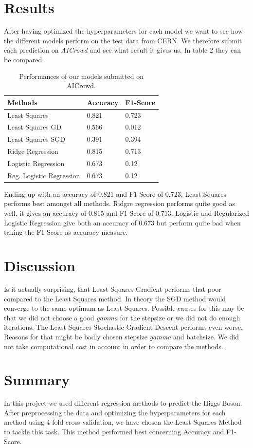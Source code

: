 \documentclass[10pt,conference,compsocconf]{IEEEtran}
\begin{document}
\section{Results}


After having optimized the hyperparameters for each model we want to see how the different models perform on the test data from CERN. We therefore submit each prediction on \textit{AICrowd} and see what result it gives us. In table 2 they can be compared.


\begin{table}[htbp]
	\centering
	\begin{tabular}[c]{|l||l|l|}
		\hline
		Methods&Accuracy&F1-Score\\
		\hline
		Least Squares&0.821&0.723\\
		Least Squares GD&0.566&0.012\\
		Least Squares SGD&0.391&0.394\\		
		Ridge Regression&0.815&0.713\\
		Logistic Regression&0.673&0.12\\
		Reg. Logistic Regression&0.673&0.12\\
		\hline
	\end{tabular}
	\caption{Performances of our models submitted on AICrowd.}
	\label{tab:perform}
\end{table}

Ending up with an accuracy of 0.821 and F1-Score of 0.723, Least Squares performs best amongst all methods. Ridgre regression performs quite good as well, it gives an accuracy of 0.815 and F1-Score of 0.713.
Logistic and Regularized Logistic Regression give both an accuracy of 0.673 but perform quite bad when taking the F1-Score as accuracy measure. 

\section{Discussion}

Is it actually surprising, that Least Squares Gradient performs that poor compared to the Least Squares method. In theory the SGD method would converge to the same optimum as Least Squares. Possible causes for this may be that we did not choose a good \textit{gamma} for the stepsize or we did not do enough iterations. The Least Squares Stochastic Gradient Descent performs even worse. Reasons for that might be badly chosen stepsize \textit{gamma} and batchsize. We did not take computational cost in account in order to compare the methods. 




\section{Summary}

In this project we used different regression methods to predict the Higgs Boson. After preprocessing the data and optimizing the hyperparameters for each method using 4-fold cross validation, we have chosen the Least Squares Method to tackle this task. This method performed best concerning Accuracy and F1-Score.  




\end{document}
